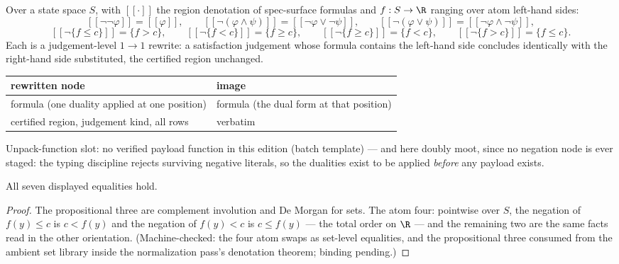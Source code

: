 

\begin{brecipe}
\label{rec:nnf-filled}
Over a state space $S$, with $[\![\cdot]\!]$ the region denotation of
spec-surface formulas and $f : S \to \R$ ranging over atom left-hand
sides:
\[
[\![\neg\neg\varphi]\!] = [\![\varphi]\!] ,\qquad
[\![\neg(\varphi \wedge \psi)]\!] = [\![\neg\varphi \vee \neg\psi]\!] ,\qquad
[\![\neg(\varphi \vee \psi)]\!] = [\![\neg\varphi \wedge \neg\psi]\!] ,
\]
\[
[\![\neg\{f \le c\}]\!] = \{f > c\} ,\qquad
[\![\neg\{f < c\}]\!] = \{f \ge c\} ,\qquad
[\![\neg\{f \ge c\}]\!] = \{f < c\} ,\qquad
[\![\neg\{f > c\}]\!] = \{f \le c\} .
\]
Each is a judgement-level $1 \to 1$ rewrite: a satisfaction judgement
whose formula contains the left-hand side concludes identically with
the right-hand side substituted, the certified region unchanged.
\end{brecipe}

\begin{brecipe}\label{rec:nnf-transport}
\begin{center}\small
\begin{tabular}{@{}ll@{}}
\textbf{rewritten node} & \textbf{image}\\
\midrule
formula (one duality applied at one position) & formula (the dual form at that position)\\
certified region, judgement kind, all rows & verbatim\\
\end{tabular}
\end{center}
Unpack-function slot: no verified payload function in this edition (batch template) ---
and here doubly moot, since no negation node is ever staged: the typing
discipline rejects surviving negative literals, so the dualities exist
to be applied \emph{before} any payload exists.
\end{brecipe}

\begin{bprop}
\label{prop:nnf-exact}
All seven displayed equalities hold.
\end{bprop}
\begin{proof}
The propositional three are complement involution and De Morgan for
sets. The atom four: pointwise over $S$, the negation of $f(y) \le c$ is
$c < f(y)$ and the negation of $f(y) < c$ is $c \le f(y)$ --- the total
order on $\R$ --- and the remaining two are the same facts read in the
other orientation. (Machine-checked: the four atom swaps as set-level
equalities, and the propositional three consumed from the ambient set
library inside the normalization pass's denotation theorem; binding
pending.)
\end{proof}

